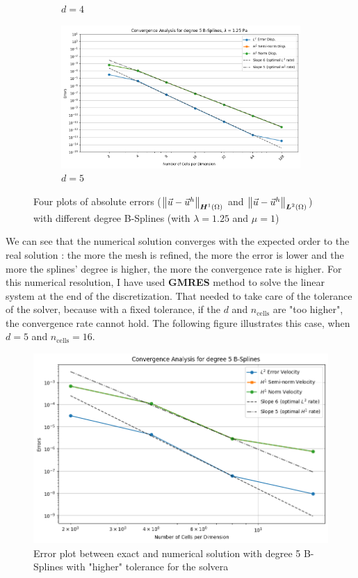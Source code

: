 \documentclass[a4paper,12pt,twoside]{report}
\begin{document}
\begin{figure}[!h]
\begin{subfigure}[b]{0.49\textwidth}
		\caption{$d=4$}
		\label{fig:deg4_NMDHBC}
	\end{subfigure}
	\begin{subfigure}[b]{0.49\textwidth}
		\centering
		\includegraphics[width=\textwidth]{figures/figures_non_mixed_DH/convergence_plot_degree_5_lambda=1.25.png}
		\caption{$d=5$}
		\label{fig:deg5_NMDHBC}
	\end{subfigure}
	\caption{Four plots of absolute errors ($\norm{\vec u - \vec u^h}_{\boldsymbol H^1(\Omega)}$ and $\norm{\vec u - \vec u^h}_{\boldsymbol L^2(\Omega)}$) with different degree B-Splines (with $\lambda = 1.25$ and $\mu = 1$)}
	\label{fig:four_errors_graphs_1}
\end{figure}

We can see that the numerical solution converges with the expected order to the real solution : the more the mesh is refined, the more the error is lower and the more the splines' degree is higher, the more the convergence rate is higher. 
For this numerical resolution, I have used \textbf{GMRES} method to solve the linear system at the end of the discretization. That needed to take care of the tolerance of the solver, because with a fixed tolerance, if the $d$ and $n_{\text{cells}}$ are "too higher", the convergence rate cannot hold. The following figure illustrates this case, when $d=5$ and $n_{\text{cells}} = 16$.

\newpage
\begin{figure}[!h]
	\centering
	\includegraphics[width=0.7\linewidth]{figures/degre5_nul}
	\caption{Error plot between exact and numerical solution with degree 5 B-Splines with "higher" tolerance for the solvera}
\end{figure}
\end{document}
